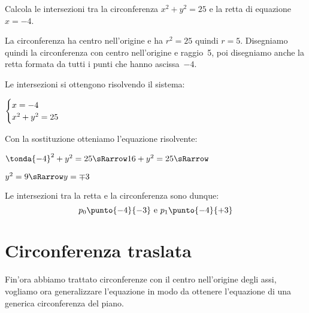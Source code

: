 \begin{esempio}
Calcola le intersezioni tra la circonferenza  \(x^2 + y^2 = 25\) e la 
retta di equazione \(x=-4\).

\noindent\begin{minipage}{.48\textwidth}
La circonferenza ha centro nell'origine e ha \(r^2 = 25\) quindi \(r=5\). 
Disegniamo quindi la circonferenza con centro nell'origine e raggio~5,
poi disegniamo anche la retta formata da tutti i punti che hanno ascissa~\(-4\).

Le intersezioni si ottengono risolvendo il sistema:

\(\begin{cases}x=-4 \\ x^2 + y^2 = 25\end{cases}\)

Con la sostituzione otteniamo l'equazione risolvente: 

\(\tonda{-4}^2 + y^2 = 25 \sRarrow 16 + y^2 = 25 \sRarrow\)

\(y^2 = 9 \sRarrow y= \mp 3\)

Le intersezioni tra la retta e la circonferenza sono dunque: 
\[p_0 \punto{-4}{-3} \text { e } p_1 \punto{-4}{+3}\]
\end{minipage}
\hfill
\begin{minipage}{.48\textwidth}
\begin{center}
\begin{inaccessibleblock}
  \circonfretta
\end{inaccessibleblock}
\end{center}
\end{minipage}
\end{esempio}

% 

\section{Circonferenza traslata}
\label{sec:circ_circtraslata}

Fin'ora abbiamo trattato circonferenze con il centro nell'origine degli assi, 
vogliamo ora generalizzare l'equazione in modo da ottenere l'equazione di una 
generica circonferenza del piano.

